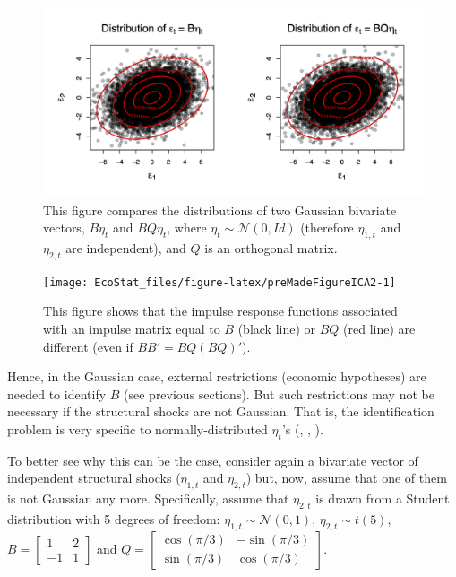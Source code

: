\documentclass[
  12pt,
]{book}
\theoremstyle{definition}
\theoremstyle{definition}
\theoremstyle{definition}
\theoremstyle{definition}
\theoremstyle{remark}
\begin{document}
\begin{figure}
\includegraphics[width=0.95\linewidth]{images/Figure_A} \caption{This figure compares the distributions of two Gaussian bivariate vectors, $B \eta_t$ and $BQ\eta_t$, where $\eta_{t} \sim \mathcal{N}(0,Id)$ (therefore $\eta_{1,t}$ and $\eta_{2,t}$ are independent), and $Q$  is an orthogonal matrix.}\label{fig:preMadeFigureICA}
\end{figure}

\begin{figure}
\texttt{[image: EcoStat\_files/figure-latex/preMadeFigureICA2-1]} \caption{This figure shows that the impulse response functions associated with an impulse matrix equal to $B$ (black line) or $BQ$ (red line) are different (even if $BB'=BQ(BQ)'$).}\label{fig:preMadeFigureICA2}
\end{figure}

Hence, in the Gaussian case, external restrictions (economic hypotheses) are needed to identify \(B\) (see previous sections). But such restrictions may not be necessary if the structural shocks are not Gaussian. That is, the identification problem is very specific to normally-distributed \(\eta_t\)'s (\citet{Rigobon_2003}, \citet{NORMANDIN20041217}, \citet{Lanne_Lutkepohl_2008}).

To better see why this can be the case, consider again a bivariate vector of independent structural shocks (\(\eta_{1,t}\) and \(\eta_{2,t}\)) but, now, assume that one of them is not Gaussian any more. Specifically, assume that \(\eta_{2,t}\) is drawn from a Student distribution with 5 degrees of freedom:
\(\eta_{1,t} \sim \mathcal{N}(0,1)\), \(\eta_{2,t} \sim t(5)\),
\(B = \left[\begin{array}{cc} 1 & 2 \\ -1 & 1 \end{array}\right]\) and
\(Q = \left[\begin{array}{cc} \cos(\pi/3) & -\sin(\pi/3) \\ \sin(\pi/3) & \cos(\pi/3) \end{array}\right]\).
\end{document}
